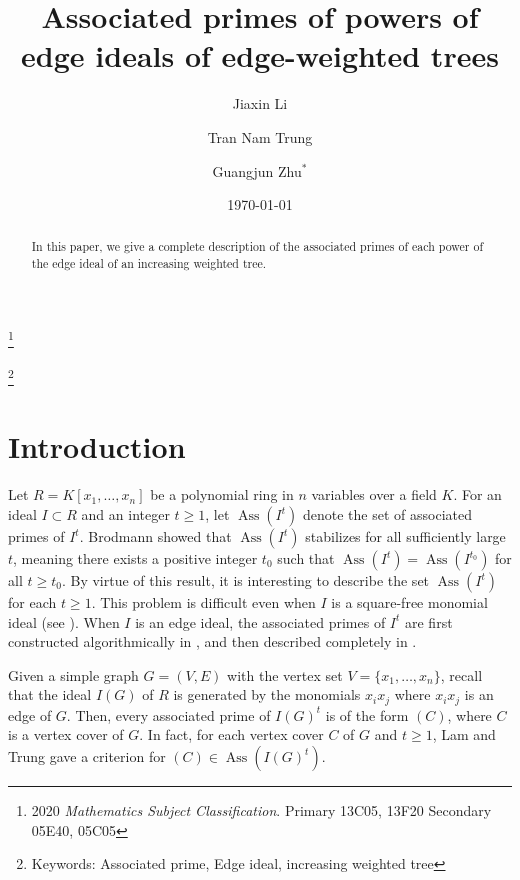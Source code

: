 \documentclass[12pt,amscd]{amsart}
\title{Associated primes of powers of edge ideals of edge-weighted trees}
\author{Jiaxin Li}
\author{Tran Nam Trung}
\author{Guangjun Zhu$^{\ast}$}
\date{\today}
\DeclareMathOperator{\ass}{Ass}
\theoremstyle{definition}
\begin{document}
\thanks{2020 {\em Mathematics Subject Classification}.
Primary  13C05,  13F20 Secondary 05E40, 05C05}

\thanks{Keywords: Associated prime, Edge ideal, increasing weighted tree}

\begin{abstract} In this paper, we give a complete description of the associated primes of each power of the edge ideal of an increasing weighted tree. 
\end{abstract}
\maketitle

\section*{Introduction}

Let $R=K[x_1, \ldots, x_n]$ be a polynomial ring in $n$ variables over a field $K$. For an ideal $I\subset R$ and an integer $t\geqslant 1$, let $\ass(I^t)$ denote the set of  associated primes of $I^t$. Brodmann \cite{B} showed that $\ass(I^t)$ stabilizes  for all sufficiently large  $t$, meaning there exists a positive integer $t_0$ such that $\ass(I^t)=\ass(I^{t_0})$  for all $t\geqslant t_0$.  By virtue of this result, it is interesting to  describe  the set  $\ass(I^t)$ for each $t\geqslant 1$. This problem is difficult even when $I$ is a square-free monomial ideal (see \cite{FHV, HM, MV}).  When $I$ is an edge ideal, the associated primes of $I^t$ are first constructed algorithmically in \cite{CMS}, and then described completely in \cite{LT}.


Given a simple graph $G=(V,E)$ with the vertex set $V = \{x_1,\ldots,x_n\}$, recall that the ideal $I(G)$ of $R$ is generated by the monomials $x_ix_j$ where $x_ix_j$ is an edge of $G$. Then, every associated prime of $I(G)^t$ is of the form $(C)$, where $C$ is a vertex cover of $G$. In fact, for each vertex cover $C$ of $G$ and $t\geqslant 1$, Lam and Trung \cite{LT} gave a criterion for $(C)\in \ass(I(G)^t)$.
\end{document}
